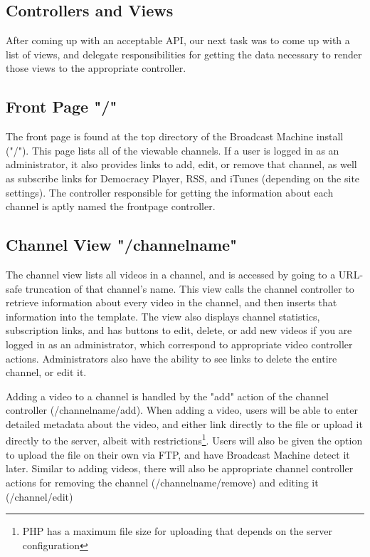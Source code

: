 \documentclass[a4paper,12pt]{report}
\begin{document}
\begin{description}
\section{Controllers and Views}
After coming up with an acceptable API, our next task was to come up with a list of views, and delegate responsibilities for getting the data necessary to render those views to the appropriate controller.

\subsection{Front Page "/"}
The front page is found at the top directory of the Broadcast Machine install ("/"). This page lists all of the viewable channels. If a user is logged in as an administrator, it also provides links to add, edit, or remove that channel, as well as subscribe links for Democracy Player, RSS, and iTunes (depending on the site settings). The controller responsible for getting the information about each channel is aptly named the frontpage controller.

\subsection{Channel View "/channelname"}
The channel view lists all videos in a channel, and is accessed by going to a URL-safe truncation of that channel's name. This view calls the channel controller to retrieve information about every video in the channel, and then inserts that information into the template. The view also displays channel statistics, subscription links, and has buttons to edit, delete, or add new videos if you are logged in as an administrator, which correspond to appropriate video controller actions. Administrators also have the ability to see links to delete the entire channel, or edit it.

Adding a video to a channel is handled by the "add" action of the channel controller (/channelname/add). When adding a video, users will be able to enter detailed metadata about the video, and either link directly to the file or upload it directly to the server, albeit with restrictions\footnote{PHP has a maximum file size for uploading that depends on the server configuration}. Users will also be given the option to upload the file on their own via FTP, and have Broadcast Machine detect it later. Similar to adding videos, there will also be appropriate channel controller actions for removing the channel (/channelname/remove) and editing it (/channel/edit)


\end{description}
\end{document}
